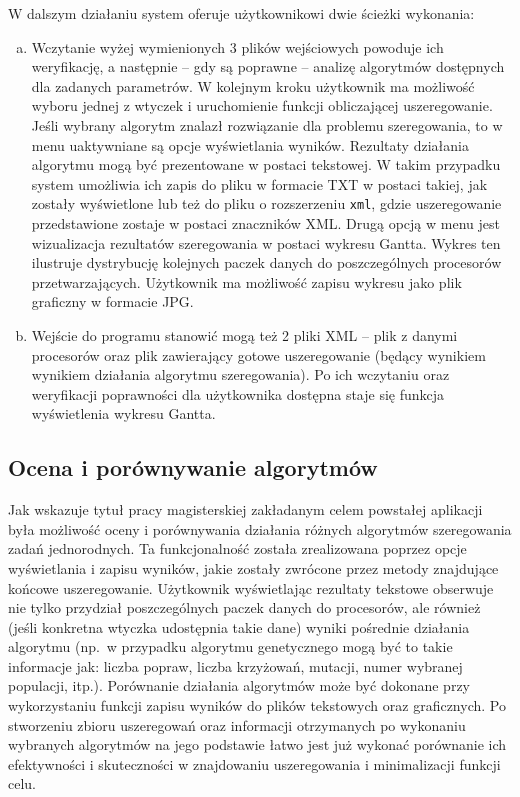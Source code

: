 W dalszym działaniu system oferuje użytkownikowi dwie ścieżki wykonania:
\begin{enumerate}[a)]
	\item \label{path1}Wczytanie wyżej wymienionych 3 plików wejściowych powoduje ich weryfikację, a następnie -- gdy są poprawne -- analizę algorytmów dostępnych 
	dla zadanych parametrów. W kolejnym kroku użytkownik ma możliwość wyboru jednej z wtyczek i uruchomienie funkcji obliczającej uszeregowanie. 
	Jeśli wybrany algorytm znalazł rozwiązanie dla problemu szeregowania, to w menu uaktywniane są opcje wyświetlania wyników. Rezultaty działania 
	algorytmu mogą być prezentowane w postaci tekstowej. W takim przypadku system umożliwia ich zapis do pliku w formacie TXT w postaci takiej, 
	jak zostały wyświetlone lub też do pliku o rozszerzeniu \texttt{xml}, gdzie uszeregowanie przedstawione zostaje w postaci znaczników XML. Drugą opcją w menu jest wizualizacja 
	rezultatów szeregowania w postaci wykresu Gantta. Wykres ten ilustruje dystrybucję kolejnych paczek danych do poszczególnych procesorów 
	przetwarzających. Użytkownik ma możliwość zapisu wykresu jako plik graficzny w formacie JPG.
	\item \label{path2}Wejście do programu stanowić mogą też 2 pliki XML -- plik z danymi procesorów oraz plik zawierający gotowe uszeregowanie (będący wynikiem 
	wynikiem działania algorytmu szeregowania). Po ich wczytaniu oraz weryfikacji poprawności dla użytkownika dostępna staje się funkcja 
	wyświetlenia wykresu Gantta.
\end{enumerate}

\subsection*{Ocena i porównywanie algorytmów}

Jak wskazuje tytuł pracy magisterskiej zakładanym celem powstałej aplikacji była możliwość oceny i porównywania działania różnych algorytmów 
szeregowania zadań jednorodnych. Ta funkcjonalność została zrealizowana poprzez opcje wyświetlania i zapisu wyników, jakie zostały zwrócone 
przez metody znajdujące końcowe uszeregowanie. Użytkownik wyświetlając rezultaty tekstowe obserwuje nie tylko przydział poszczególnych paczek danych 
do procesorów, ale również (jeśli konkretna wtyczka udostępnia takie dane) wyniki pośrednie działania algorytmu (np.~w przypadku algorytmu genetycznego 
mogą być to takie informacje jak: liczba popraw, liczba krzyżowań, mutacji, numer wybranej populacji, itp.). Porównanie działania algorytmów 
może być dokonane przy wykorzystaniu funkcji zapisu wyników do plików tekstowych oraz graficznych. Po stworzeniu zbioru uszeregowań oraz 
informacji otrzymanych po wykonaniu wybranych algorytmów na jego podstawie łatwo jest już wykonać porównanie ich efektywności i skuteczności 
w znajdowaniu uszeregowania i minimalizacji funkcji celu.

